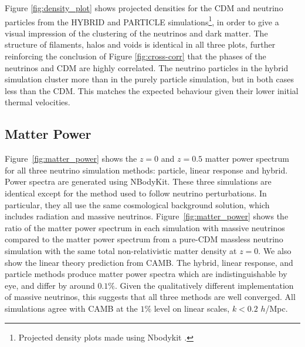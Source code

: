 \documentclass[useAMS, usenatbib]{mnras}
\begin{document}
Figure \ref{fig:density_plot} shows projected densities for the CDM and neutrino particles from the HYBRID and PARTICLE simulations\footnote{Projected density plots made using Nbodykit \citep{Hand_2017}.}, in order to give a visual impression of the clustering of the neutrinos and dark matter. The structure of filaments, halos and voids is identical in all three plots, further reinforcing the conclusion of Figure \ref{fig:cross-corr} that the phases of the neutrinos and CDM are highly correlated. The neutrino particles in the hybrid simulation cluster more than in the purely particle simulation, but in both cases less than the CDM. This matches the expected behaviour given their lower initial thermal velocities.

\subsection{Matter Power}
\label{sec:matterpower}

Figure~\ref{fig:matter_power} shows the $z=0$ and $z=0.5$ matter power spectrum for all three neutrino simulation methods: particle, linear response and hybrid. Power spectra are generated using NBodyKit. These three simulations are identical except for the method used to follow neutrino perturbations. In particular, they all use the same cosmological background solution, which includes radiation and massive neutrinos. Figure~\ref{fig:matter_power} shows the ratio of the matter power spectrum in each simulation with massive neutrinos compared to the matter power spectrum from a pure-CDM massless neutrino simulation with the same total non-relativistic matter density at $z = 0$. We also show the linear theory prediction from CAMB. The hybrid, linear response, and particle methods produce matter power spectra which are indistinguishable by eye, and differ by around $0.1\%$. Given the qualitatively different implementation of massive neutrinos, this suggests that all three methods are well converged. All simulations agree with CAMB at the $1\%$ level on linear scales, $k < 0.2$ $h$/Mpc.
\end{document}
